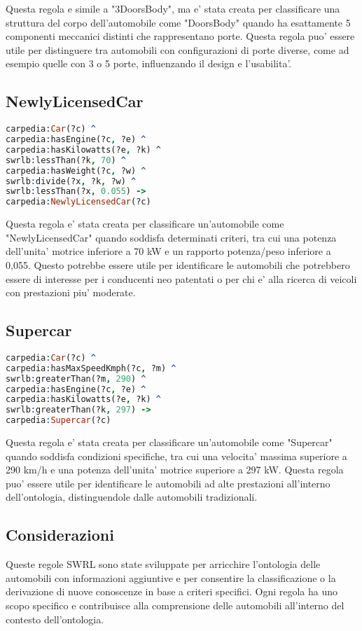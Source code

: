 Questa regola e simile a "3DoorsBody", ma e' stata creata per classificare una struttura del corpo dell'automobile
come "DoorsBody" quando ha esattamente 5 componenti meccanici distinti che rappresentano porte.
Questa regola puo' essere utile per distinguere tra automobili con configurazioni di porte diverse,
come ad esempio quelle con 3 o 5 porte, influenzando il design e l'usabilita'.

\subsection{NewlyLicensedCar}

\begin{lstlisting}[language=Prolog]
carpedia:Car(?c) ^
carpedia:hasEngine(?c, ?e) ^
carpedia:hasKilowatts(?e, ?k) ^
swrlb:lessThan(?k, 70) ^
carpedia:hasWeight(?c, ?w) ^
swrlb:divide(?x, ?k, ?w) ^
swrlb:lessThan(?x, 0.055) ->
carpedia:NewlyLicensedCar(?c)
\end{lstlisting}


Questa regola e' stata creata per classificare un'automobile come "NewlyLicensedCar" quando soddisfa
determinati criteri, tra cui una potenza dell'unita' motrice inferiore a 70 kW e un rapporto potenza/peso
inferiore a 0,055.
Questo potrebbe essere utile per identificare le automobili che potrebbero essere di interesse per i conducenti
neo patentati o per chi e' alla ricerca di veicoli con prestazioni piu' moderate.

\subsection{Supercar}

\begin{lstlisting}[language=Prolog]
carpedia:Car(?c) ^
carpedia:hasMaxSpeedKmph(?c, ?m) ^
swrlb:greaterThan(?m, 290) ^
carpedia:hasEngine(?c, ?e) ^
carpedia:hasKilowatts(?e, ?k) ^
swrlb:greaterThan(?k, 297) ->
carpedia:Supercar(?c)
\end{lstlisting}


Questa regola e' stata creata per classificare un'automobile come "Supercar" quando soddisfa condizioni
specifiche, tra cui una velocita' massima superiore a 290 km/h e una potenza dell'unita' motrice superiore a 297 kW.
Questa regola puo' essere utile per identificare le automobili ad alte prestazioni all'interno dell'ontologia,
distinguendole dalle automobili tradizionali.

\subsection{Considerazioni}
Queste regole SWRL sono state sviluppate per arricchire l'ontologia delle automobili con informazioni
aggiuntive e per consentire la classificazione o la derivazione di nuove conoscenze in base a criteri specifici.
Ogni regola ha uno scopo specifico e contribuisce alla comprensione delle automobili all'interno del contesto
dell'ontologia.


